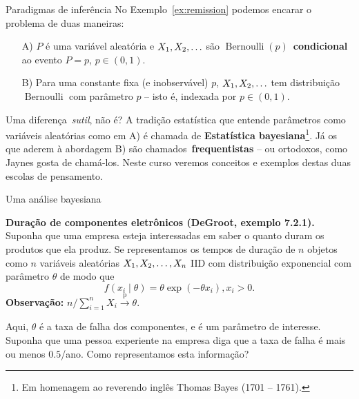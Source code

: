 \begin{frame}{Paradigmas de inferência}
No Exemplo~\ref{ex:remission} podemos encarar o problema de duas maneiras:
\begin{itemize}
 \item[A)] $P$ é uma variável aleatória e $X_1, X_2, \ldots$ são $\operatorname{Bernoulli}(p)$~\textbf{condicional} ao evento $P = p$, $p \in (0, 1)$.
 \item[B)] Para uma constante fixa (e inobservável) $p$, $X_1, X_2, \ldots$ tem distribuição $\operatorname{Bernoulli}$ com parâmetro $p$ -- isto é, indexada por $p \in (0, 1)$.
\end{itemize}
Uma diferença~\textit{sutil}, não é?
A tradição estatística que entende parâmetros como variáveis aleatórias como em A) é chamada de \textbf{Estatística bayesiana}\footnote{Em homenagem ao reverendo inglês Thomas Bayes (1701 -- 1761).}.
Já os que aderem à abordagem B) são chamados~\textbf{frequentistas} -- ou ortodoxos, como Jaynes gosta de chamá-los.
Neste curso veremos conceitos e exemplos destas duas escolas de pensamento. 
\end{frame}
\begin{frame}{Uma análise bayesiana}
\begin{exemplo}
\label{ex:duracao_componentes}
\textbf{Duração de componentes eletrônicos (DeGroot, exemplo 7.2.1).}
Suponha que uma empresa esteja interessadas em saber o quanto duram os produtos que ela produz.
Se representamos os tempos de duração de $n$ objetos como $n$ variáveis aleatórias $X_1, X_2, \ldots, X_n$ IID com distribuição exponencial com parâmetro $\theta$ de modo que
$$f(x_i \mid \theta) = \theta \exp(-\theta x_i), x_i > 0.$$
\textbf{Observação:} $n/\sum_{i=1}^n X_i \xrightarrow{\text{p}} \theta$.

Aqui, $\theta$ é a taxa de falha dos componentes, e é um parâmetro de interesse.
Suponha que uma pessoa experiente na empresa diga que a taxa de falha é mais ou menos $0.5$/ano.
Como representamos esta informação?
\end{exemplo} 
\end{frame}
